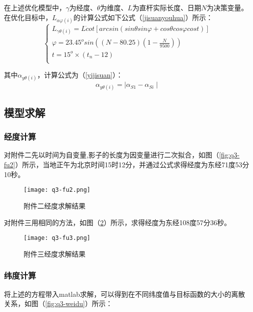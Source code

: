 \documentclass[withoutpreface,bwprint]{cumcmthesis} %
\begin{document}
在上述优化模型中，$\gamma$为经度、$\theta$为维度、$L$为直杆实际长度、日期$N$为决策变量。在优化目标中，$L_{\alpha \varphi (i)}$的计算公式如下公式（\ref{jisuanyouhua}）所示：
\begin{equation}
\label{jisuanyouhua}
\left\{  
  	\begin{array}{lr}  
  		L_{\gamma \theta (i)} = L \dot cot[arcsin(sin\theta sin\varphi + cos\theta cos\varphi cost)]\\
  		\varphi = 23.45^o sin((N-80.25)(1-\frac{N}{9500}))\\
  		t = 15^o\times (t_n -12)\\
	\end{array}  
\right.  
\end{equation}

其中$\alpha_{ y \theta(i)}$，计算公式为（\ref{yijisuan}）：
\begin{equation}
	\label{yijisuan}
	\alpha_{ y \theta(i)} = \mid \alpha_{S1} - \alpha_{Si}  \mid 
\end{equation}

\subsection{模型求解}
\subsubsection{经度计算}
对附件二先以时间为自变量,影子的长度为因变量进行二次拟合，如图（\ref{fig:q3-fu2}）所示，当地正午为北京时间15时12分，并通过公式求得经度为东经71度53分10秒。
\begin{figure}[h]
\small
\centering
\texttt{[image: q3-fu2.png]}
\caption{附件二经度求解结果} \label{fig:q3-fu3}
\end{figure}

对附件三用相同的方法，如图（\ref{fig:q3-fu3}）所示，求得经度为东经108度57分36秒。

\begin{figure}[h]
\small
\centering
\texttt{[image: q3-fu3.png]}
\caption{附件三经度求解结果} \label{fig:q3-fu3}
\end{figure}

\subsubsection{纬度计算}

将上述的方程带入matlab求解，可以得到在不同纬度值与目标函数的大小的离散关系，如图（\ref{fig:q3-weidu}）所示：
\end{document}
